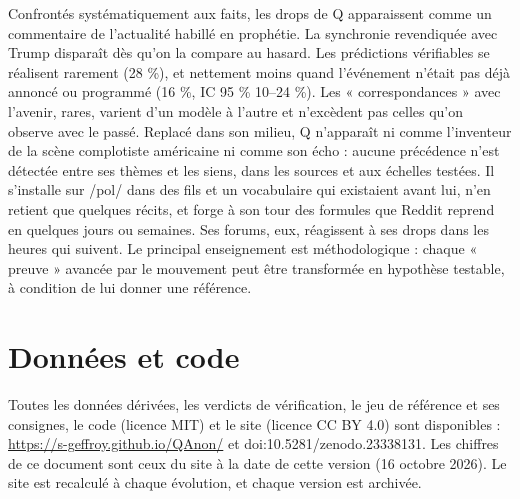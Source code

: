 \documentclass[11pt,a4paper]{article}
\begin{document}
Confrontés systématiquement aux faits, les drops de Q apparaissent comme un commentaire de l'actualité habillé en prophétie. La synchronie revendiquée avec Trump disparaît dès qu'on la compare au hasard. Les prédictions vérifiables se réalisent rarement (28 \%), et nettement moins quand l'événement n'était pas déjà annoncé ou programmé (16 \%, IC 95 \% 10–24 \%). Les « correspondances » avec l'avenir, rares, varient d'un modèle à l'autre et n'excèdent pas celles qu'on observe avec le passé. Replacé dans son milieu, Q n'apparaît ni comme l'inventeur de la scène complotiste américaine ni comme son écho : aucune précédence n'est détectée entre ses thèmes et les siens, dans les sources et aux échelles testées. Il s'installe sur /pol/ dans des fils et un vocabulaire qui existaient avant lui, n'en retient que quelques récits, et forge à son tour des formules que Reddit reprend en quelques jours ou semaines. Ses forums, eux, réagissent à ses drops dans les heures qui suivent. Le principal enseignement est méthodologique : chaque « preuve » avancée par le mouvement peut être transformée en hypothèse testable, à condition de lui donner une référence.

\section*{Données et code}

Toutes les données dérivées, les verdicts de vérification, le jeu de référence et ses consignes, le code (licence MIT) et le site (licence CC BY 4.0) sont disponibles : \url{https://s-geffroy.github.io/QAnon/} et doi:10.5281/zenodo.23338131. Les chiffres de ce document sont ceux du site à la date de cette version (16 octobre 2026). Le site est recalculé à chaque évolution, et chaque version est archivée.

\printbibliography[title={Références}]
\end{document}
